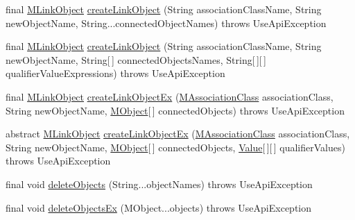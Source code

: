 \begin{DoxyCompactItemize}
\item 
final \hyperlink{interfaceorg_1_1tzi_1_1use_1_1uml_1_1sys_1_1_m_link_object}{M\-Link\-Object} \hyperlink{classorg_1_1tzi_1_1use_1_1api_1_1_use_system_api_a7e9169da1919e91651efb88124e9febf}{create\-Link\-Object} (String association\-Class\-Name, String new\-Object\-Name, String...\-connected\-Object\-Names)  throws Use\-Api\-Exception 
\item 
final \hyperlink{interfaceorg_1_1tzi_1_1use_1_1uml_1_1sys_1_1_m_link_object}{M\-Link\-Object} \hyperlink{classorg_1_1tzi_1_1use_1_1api_1_1_use_system_api_a083c233b6072962e389f75c5ee8ffadb}{create\-Link\-Object} (String association\-Class\-Name, String new\-Object\-Name, String\mbox{[}$\,$\mbox{]} connected\-Objects\-Names, String\mbox{[}$\,$\mbox{]}\mbox{[}$\,$\mbox{]} qualifier\-Value\-Expressions)  throws Use\-Api\-Exception 
\item 
final \hyperlink{interfaceorg_1_1tzi_1_1use_1_1uml_1_1sys_1_1_m_link_object}{M\-Link\-Object} \hyperlink{classorg_1_1tzi_1_1use_1_1api_1_1_use_system_api_a70932db8088e5fbed2338e46ce989819}{create\-Link\-Object\-Ex} (\hyperlink{interfaceorg_1_1tzi_1_1use_1_1uml_1_1mm_1_1_m_association_class}{M\-Association\-Class} association\-Class, String new\-Object\-Name, \hyperlink{interfaceorg_1_1tzi_1_1use_1_1uml_1_1sys_1_1_m_object}{M\-Object}\mbox{[}$\,$\mbox{]} connected\-Objects)  throws Use\-Api\-Exception 
\item 
abstract \hyperlink{interfaceorg_1_1tzi_1_1use_1_1uml_1_1sys_1_1_m_link_object}{M\-Link\-Object} \hyperlink{classorg_1_1tzi_1_1use_1_1api_1_1_use_system_api_ade1107ec788d103858738f6645433046}{create\-Link\-Object\-Ex} (\hyperlink{interfaceorg_1_1tzi_1_1use_1_1uml_1_1mm_1_1_m_association_class}{M\-Association\-Class} association\-Class, String new\-Object\-Name, \hyperlink{interfaceorg_1_1tzi_1_1use_1_1uml_1_1sys_1_1_m_object}{M\-Object}\mbox{[}$\,$\mbox{]} connected\-Objects, \hyperlink{classorg_1_1tzi_1_1use_1_1uml_1_1ocl_1_1value_1_1_value}{Value}\mbox{[}$\,$\mbox{]}\mbox{[}$\,$\mbox{]} qualifier\-Values)  throws Use\-Api\-Exception
\item 
final void \hyperlink{classorg_1_1tzi_1_1use_1_1api_1_1_use_system_api_a3a538a589e677d3e779955d71dcd2db9}{delete\-Objects} (String...\-object\-Names)  throws Use\-Api\-Exception 
\item 
final void \hyperlink{classorg_1_1tzi_1_1use_1_1api_1_1_use_system_api_a034fa11d37bf1b372e2807c5ac9b7af1}{delete\-Objects\-Ex} (M\-Object...\-objects)  throws Use\-Api\-Exception 
\item 

\end{DoxyCompactItemize}
